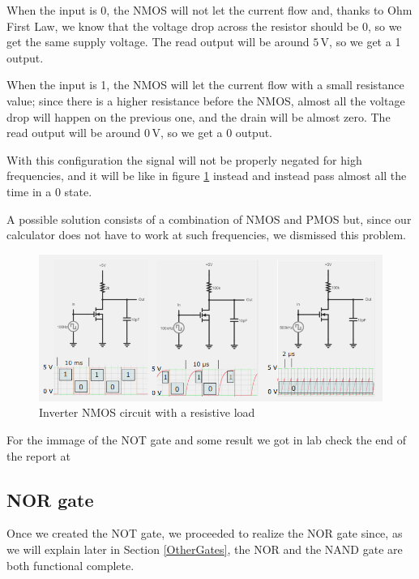 \documentclass{article}
\begin{document}
When the input is 0, the NMOS will not let the current flow and, thanks to Ohm First Law, we know that the voltage drop across the resistor should be 0, so we get the same supply voltage. The read output will be around $5\,\textrm{V}$, so we get a 1 output.

\vspace{3mm}

When the input is 1, the NMOS will let the current flow with a small resistance value; since there is a higher resistance before the NMOS, almost all the voltage drop will happen on the previous one, and the drain will be almost zero. The read output will be around $0\,\textrm{V}$, so we get a 0 output.

\vspace{3mm}

With this configuration the signal will not be properly negated for high frequencies, and it will be like in figure \ref{ResistiveInverter}
instead
and instead pass almost all the time in a 0 state. 

A possible solution consists of a combination of NMOS and PMOS but, since our calculator does not have to work at such frequencies, we dismissed this problem.

\begin{figure}[h]
    \centering
    \includegraphics[scale=0.6]{IM_inverter_esa.PNG}
    \caption{Inverter NMOS circuit with a resistive load}
    \label{ResistiveInverter}
\end{figure}

For the immage of the NOT gate and some result we got in lab check the end of the report at %



\subsection{NOR gate}

Once we created the NOT gate, we proceeded to realize the NOR gate since, as we will explain later in Section \ref{OtherGates}, the NOR and the NAND gate are both functional complete.
\end{document}
